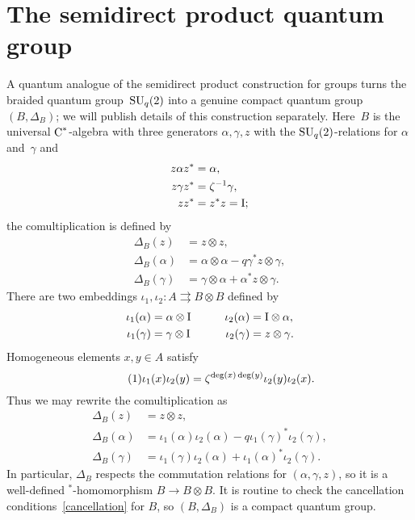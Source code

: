 \documentclass[a4paper]{amsart}
\numberwithin{equation}{section}
\theoremstyle{definition}
\theoremstyle{remark}
\begin{document}
\section{The semidirect product quantum group}
\label{sec:U2}

A quantum analogue of the semidirect product construction for groups
turns the braided quantum group~${\textup{SU}}_q(2)$ into a genuine compact
quantum group $(B,\Delta_B)$; we will publish details of this
construction separately.  Here~\(B\) is the universal
\({\textup{C}^*}\){\nobreakdash}-algebra with three generators $\alpha,\gamma,z$ with the
${\textup{SU}}_q(2)$-relations for $\alpha$ and~$\gamma$ and
\begin{align*}
  z\alpha z^* &=\alpha,\\
  z\gamma z^* &= \zeta^{-1}\gamma,\\
  z z^* &=z^*z = {\textup{I}};
\end{align*}
the comultiplication is defined by
\begin{align*}
  \Delta_B(z)&= z\otimes z,\\
  \Delta_B(\alpha) &= \alpha\otimes\alpha-q\gamma^*z\otimes\gamma,\\
  \Delta_B(\gamma) &=\gamma\otimes\alpha+\alpha^*z\otimes\gamma.
\end{align*}
There are two embeddings $\iota_1, \iota_2\colon A \rightrightarrows
B\otimes B$ defined by
\begin{alignat*}{2}
  \iota_1(\alpha) &= \alpha\otimes {\textup{I}}&\qquad
  \iota_2(\alpha) &= {\textup{I}}\otimes\alpha, \\
  \iota_1(\gamma) &= \gamma\otimes {\textup{I}}&\qquad
  \iota_2(\gamma) &= z\otimes\gamma.
\end{alignat*}
Homogeneous elements $x,y\in A$ satisfy
\[
{\label{{SU2_commutation}}\stepcounter{equation}\tag{\theequation}}
\iota_1(x)\iota_2(y) = \zeta^{\deg(x)\deg(y)}\iota_2(y)\iota_2(x).
\]
Thus we may rewrite the comultiplication as
\begin{align*}
  \Delta_B(z)&= z\otimes z,\\
  \Delta_B(\alpha) &=
  \iota_1(\alpha)\iota_2(\alpha)-q\iota_1(\gamma)^*\iota_2(\gamma),\\
  \Delta_B(\gamma) &=
  \iota_1(\gamma)\iota_2(\alpha)+\iota_1(\alpha)^*\iota_2(\gamma).
\end{align*}
In particular, $\Delta_B$ respects the commutation relations for
$(\alpha,\gamma,z)$, so it is a well-defined
$^*${\nobreakdash}-\hspace{0pt}homomorphism \(B\to B\otimes B\).  It is routine
to check the cancellation conditions~\eqref{cancellation} for \(B\),
so $(B,\Delta_B)$ is a compact quantum group.
\end{document}
